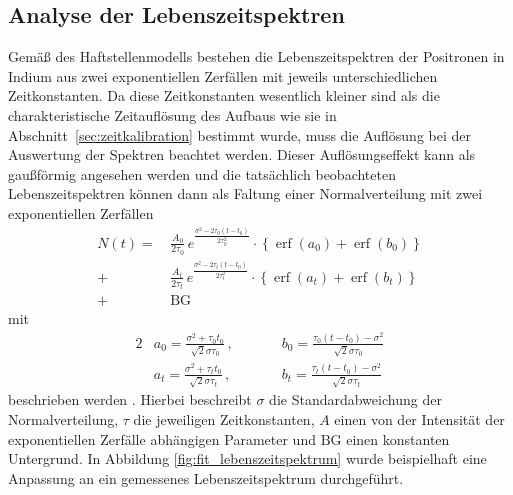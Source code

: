 \documentclass[11pt, a4paper]{article}
\numberwithin{equation}{section}
\DeclareMathOperator{\erf}{erf}
\begin{document}
\subsection{Analyse der Lebenszeitspektren}
\label{sec:analyse_lebenszeitspektren}
Gemäß des Haftstellenmodells bestehen die Lebenszeitspektren der Positronen in Indium aus zwei exponentiellen Zerfällen mit jeweils unterschiedlichen Zeitkonstanten.
Da diese Zeitkonstanten wesentlich kleiner sind als die charakteristische Zeitauflösung des Aufbaus wie sie in Abschnitt~\ref{sec:zeitkalibration} bestimmt wurde, muss die Auflösung bei der Auswertung der Spektren beachtet werden.
Dieser Auflösungseffekt kann als gaußförmig angesehen werden und die tatsächlich beobachteten Lebenszeitspektren können dann als Faltung einer Normalverteilung mit zwei exponentiellen Zerfällen
\begin{align}
	N(t) = \, &\frac{A_0}{2 \tau_0} \, e^{\frac{\sigma^2 - 2 \tau_0 (t - t_0)}{2 \tau_0^2}} \cdot \left\{ \erf(a_0) + \erf(b_0) \right\} \nonumber\\
	+ &\frac{A_t}{2 \tau_t} \, e^{\frac{\sigma^2 - 2 \tau_t (t - t_0)}{2 \tau_t^2}} \cdot \left\{ \erf(a_t) + \erf(b_t) \right\} \nonumber\\
	+ &\mathrm{BG}
	\label{eq:spektrum_fit}
\end{align}
mit
\begin{alignat*}{2}
	&a_0 = \frac{\sigma^2 + \tau_0 t_0}{\sqrt{2} \sigma \tau_0} \,\text{,} \qquad
	&&b_0 = \frac{\tau_0 (t - t_0) - \sigma^2}{\sqrt{2} \sigma \tau_0} \\
	&a_t = \frac{\sigma^2 + \tau_t t_0}{\sqrt{2} \sigma \tau_t} \,\text{,} \qquad
	&&b_t = \frac{\tau_t (t - t_0) - \sigma^2}{\sqrt{2} \sigma \tau_t}
\end{alignat*}
beschrieben werden \cite{add_infos}.
Hierbei beschreibt $\sigma$ die Standardabweichung der Normalverteilung, $\tau$ die jeweiligen Zeitkonstanten, $A$ einen von der Intensität der exponentiellen Zerfälle abhängigen Parameter und $\mathrm{BG}$ einen konstanten Untergrund.
In Abbildung \ref{fig:fit_lebenszeitspektrum} wurde beispielhaft eine Anpassung an ein gemessenes Lebenszeitspektrum durchgeführt.
\end{document}
